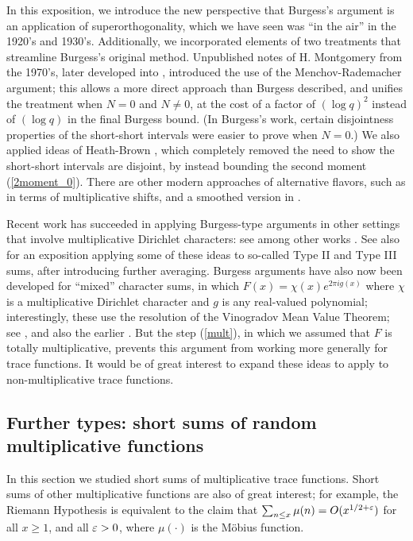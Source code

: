 \documentclass[oneside,11pt]{amsart}
\begin{document}
 
 
 In this exposition, we introduce the new perspective that Burgess's argument is an application of superorthogonality, which we have seen was ``in the air'' in the 1920's and 1930's.
Additionally, we incorporated elements of two    treatments that streamline  Burgess's original method. Unpublished notes of H. Montgomery from the 1970's,   later   developed into  \cite{GalMon10}, introduced the use of the Menchov-Rademacher argument; this allows a more direct approach than Burgess described, and unifies the treatment when $N=0$ and $N \neq 0$, at the cost of a factor of $(\log q)^2$ instead of $(\log q)$ in the final Burgess bound. (In Burgess's work, certain disjointness properties of the short-short intervals were easier to prove when $N=0$.)  We also applied ideas of Heath-Brown   \cite{HB12}, which completely removed the need to show the short-short intervals are disjoint, by instead bounding the second moment (\ref{2moment_0}). There are other modern approaches of alternative flavors, such as  \cite[Thm. 12.6]{IK} in terms of multiplicative shifts, and a smoothed version in \cite[\S 17]{FKMS19}.
 



 Recent work has succeeded in applying Burgess-type arguments in other settings that involve multiplicative Dirichlet characters: see among other works \cite{DavLew63,Cha08,Cha09,BouCha10,HB12,HB16}. See also \cite[\S 17.2, \S 17.3]{FKMS19} for an exposition applying some of these ideas to so-called Type II and Type III sums, after introducing further averaging.
  Burgess arguments have also now been developed for ``mixed'' character sums, in which $F(x) = \chi(x) e^{2\pi i g(x)}$ where $\chi$ is a multiplicative Dirichlet character and $g$ is any real-valued polynomial; interestingly, these use the resolution of the Vinogradov Mean Value Theorem; see \cite{HBP15, Pie16, PieXu19, Pie20x}, and also the earlier \cite{Cha10}.
But the step (\ref{mult}), in  which we assumed that $F$ is totally multiplicative, prevents this argument from working more generally for  trace functions.  It would be of great interest to expand these ideas to apply to non-multiplicative trace functions.
 
  \subsection{Further types: short sums of random multiplicative functions}

  In this section we studied short sums of multiplicative trace functions. Short sums of other multiplicative functions are also of great interest; for example, the Riemann Hypothesis is equivalent to the claim that 
$ \sum_{n \leq x} \mu(n) = O(x^{1/2 + \varepsilon})$ for all $x \geq 1$,  and all $\varepsilon>0$, where $\mu(\cdot)$ is the M\"obius function. 
\end{document}
